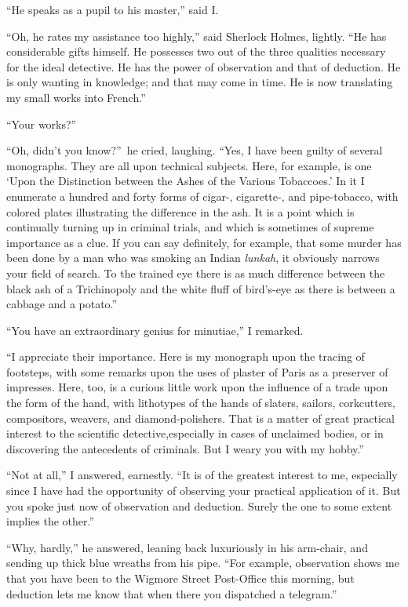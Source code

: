 \documentclass[12pt,english,oneside]{book}
\begin{document}
{}``He speaks as a pupil to his master,'' said I.

{}``Oh, he rates my assistance too highly,'' said Sherlock Holmes,
lightly. {}``He has considerable gifts himself. He possesses two
out of the three qualities necessary for the ideal detective. He has
the power of observation and that of deduction. He is only wanting
in knowledge; and that may come in time. He is now translating my
small works into French.''

{}``Your works?''

{}``Oh, didn't you know?''\ he cried, laughing. {}``Yes, I have
been guilty of several monographs. They are all upon technical subjects.
Here, for example, is one `Upon the Distinction between the Ashes
of the Various Tobaccoes.' In it I enumerate a hundred and forty forms
of cigar-, cigarette-, and pipe-tobacco, with colored plates illustrating
the difference in the ash. It is a point which is continually turning
up in criminal trials, and which is sometimes of supreme importance
as a clue. If you can say definitely, for example, that some murder
has been done by a man who was smoking an Indian \emph{lunkah}, it
obviously narrows your field of search. To the trained eye there is
as much difference between the black ash of a Trichinopoly and the
white fluff of bird's-eye as there is between a cabbage and a potato.''

{}``You have an extraordinary genius for minutiae,'' I remarked.

{}``I appreciate their importance. Here is my monograph upon the
tracing of footsteps, with some remarks upon the uses of plaster of
Paris as a preserver of impresses. Here, too, is a curious little
work upon the influence of a trade upon the form of the hand, with
lithotypes of the hands of slaters, sailors, corkcutters, compositors,
weavers, and diamond-polishers. That is a matter of great practical
interest to the scientific detective,\mdsh{---}especially in cases
of unclaimed bodies, or in discovering the antecedents of criminals.
But I weary you with my hobby.''

{}``Not at all,'' I answered, earnestly. {}``It is of the greatest
interest to me, especially since I have had the opportunity of observing
your practical application of it. But you spoke just now of observation
and deduction. Surely the one to some extent implies the other.''

{}``Why, hardly,'' he answered, leaning back luxuriously in his
arm-chair, and sending up thick blue wreaths from his pipe. {}``For
example, observation shows me that you have been to the Wigmore Street
Post-Office this morning, but deduction lets me know that when there
you dispatched a telegram.''
\end{document}
